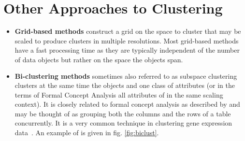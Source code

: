 \section{Other Approaches to Clustering}
\begin{itemize}
    \item \textbf{Grid-based methods} construct a grid on the space to cluster that may be scaled to produce clusters in multiple resolutions. Most grid-based methods have a fast processing time as they are typically independent of the number of data objects but rather on the space the objects span.
    
    \item \textbf{Bi-clustering methods} sometimes also referred to as subspace clustering clusters at the same time the objects and one class of attributes (or in the terms of Formal Concept Analysis all attributes of in the same scaling context). It is closely related to formal concept analysis as described by\cite{ignatov2012concept} and may be thought of as grouping both the columns and the rows of a table concurrently. It is a very common technique in clustering gene expression data~\cite{PONTES2015163}. An example of is given in fig. \ref{fig:biclust}. 


\end{itemize}

